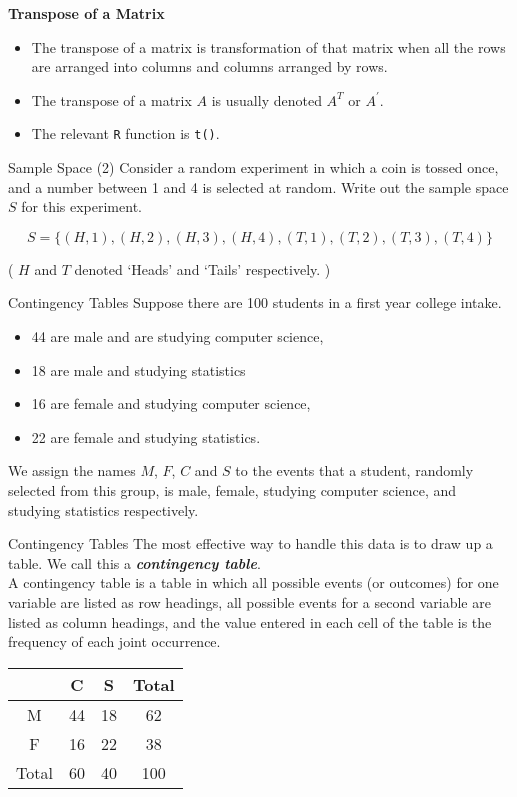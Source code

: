 \documentclass[]{report}
\begin{document}
{{{{{{{	
	\textbf{Transpose of a Matrix}
	\begin{itemize}
		
		\item The transpose of a matrix is transformation of that matrix when all the rows are arranged into columns and columns arranged by rows.
		\item The transpose of a matrix $A$ is usually denoted $A^{T}$ or $A^{\prime}$.
		\item The relevant \texttt{R} function is \texttt{t()}.
	\end{itemize}

	{Sample Space (2)}
	Consider a random experiment in which a coin is tossed once, and a number between 1 and 4 is selected at random.
	Write out the sample space $S$ for this experiment.
	
	\bigskip
	
	\[ S = \{(H,1),(H,2),(H,3),(H,4),(T,1),(T,2),(T,3),(T,4)\} \]
	
	( $H$ and $T$ denoted `Heads' and `Tails' respectively. )
	
}
{
	{Contingency Tables}
	Suppose there are 100 students in a first year college intake.  \begin{itemize} \item 44 are male and are studying computer science, \item 18 are male and studying statistics \item 16 are female and studying computer science, \item 22 are female and studying statistics. \end{itemize}
	\bigskip
	We assign the names $M$, $F$, $C$ and $S$ to the events that a student, randomly selected from this group, is male, female, studying computer science, and studying statistics respectively.
}
{
	{Contingency Tables}
	The most effective way to handle this data is to draw up a table. We call this a \textbf{\emph{contingency table}}.
	\\A contingency table is a table in which all possible events (or outcomes) for one variable are listed as
	row headings, all possible events for a second variable are listed as column headings, and the value entered in
	each cell of the table is the frequency of each joint occurrence.
	
	
	\begin{center}
		\begin{tabular}{|c|c|c|c|}
			\hline
			& C & S & Total \\ \hline
			M & 44 & 18 & 62 \\ \hline
			F & 16 & 22 & 38 \\ \hline
			Total & 60 & 40 & 100 \\ \hline
		\end{tabular}
	\end{center}
	
}}}}}}}
\end{document}
